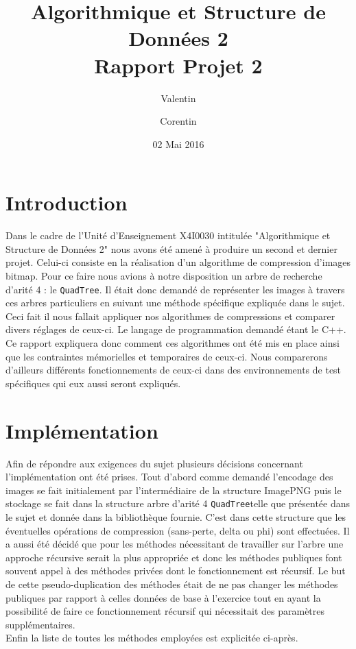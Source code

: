\documentclass{article}
\title{Algorithmique et Structure de Données 2\\
Rapport Projet 2}
\author{Valentin \bsc{Hénique} \and Corentin \bsc{Chédotal}}
\date{02 Mai 2016}
\newcommand{\info}{\texttt}
\newcommand{\qt}{\info{QuadTree}}
\begin{document}
\maketitle

\section{Introduction}

Dans le cadre de l'Unité d'Enseignement X4I0030 intitulée "Algorithmique et Structure de Données 2" nous avons été amené à produire un second et dernier projet. Celui-ci consiste en la réalisation d'un algorithme de compression d'images bitmap. Pour ce faire nous avions à notre disposition un arbre de recherche d'arité 4 : le \qt. Il était donc demandé de représenter les images à travers ces arbres particuliers en suivant une méthode spécifique expliquée dans le sujet. Ceci fait il nous fallait appliquer nos algorithmes de compressions et comparer divers réglages de ceux-ci.
Le langage de programmation demandé étant le C++.\\
Ce rapport expliquera donc comment ces algorithmes ont été mis en place ainsi que les contraintes mémorielles et temporaires de ceux-ci. Nous comparerons d'ailleurs différents fonctionnements de ceux-ci dans des environnements de test spécifiques qui eux aussi seront expliqués.

\section{Implémentation}

Afin de répondre aux exigences du sujet plusieurs décisions concernant l'implémentation ont été prises. Tout d'abord comme demandé l'encodage des images se fait initialement par l'intermédiaire de la structure ImagePNG puis le stockage se fait dans la structure arbre d'arité 4 \qt telle que présentée dans le sujet et donnée dans la bibliothèque fournie. C'est dans cette structure que les éventuelles opérations de compression (sans-perte, delta ou phi) sont effectuées. Il a aussi été décidé que pour les méthodes nécessitant de travailler sur l'arbre une approche récursive serait la plus appropriée et donc les méthodes publiques font souvent appel à des méthodes privées dont le fonctionnement est récursif. Le but de cette pseudo-duplication des méthodes était de ne pas changer les méthodes publiques par rapport à celles données de base à l'exercice tout en ayant la possibilité de faire ce fonctionnement récursif qui nécessitait des paramètres supplémentaires.\\
Enfin la liste de toutes les méthodes employées est explicitée ci-après.
\end{document}

